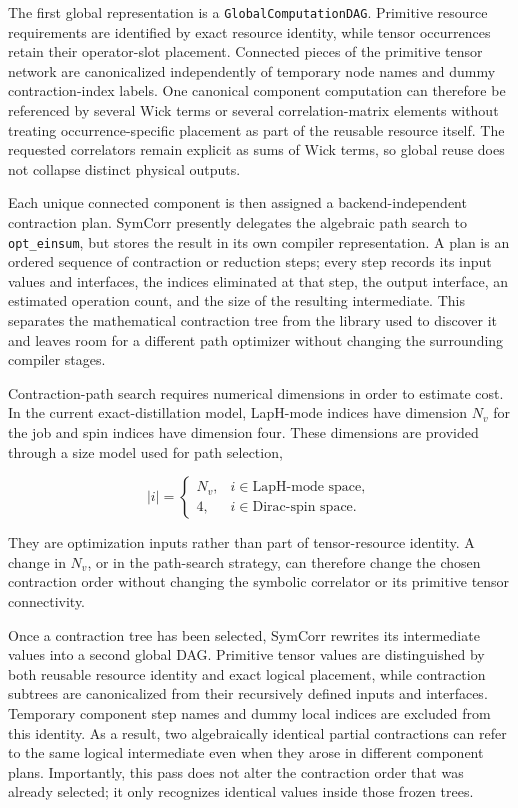 \documentclass[11pt]{article}
\begin{document}
The first global representation is a \texttt{GlobalComputationDAG}. Primitive
resource requirements are identified by exact resource identity, while tensor
occurrences retain their operator-slot placement. Connected pieces of the
primitive tensor network are canonicalized independently of temporary node names
and dummy contraction-index labels. One canonical component computation can
therefore be referenced by several Wick terms or several correlation-matrix
elements without treating occurrence-specific placement as part of the reusable
resource itself. The requested correlators remain explicit as sums of Wick
terms, so global reuse does not collapse distinct physical outputs.

Each unique connected component is then assigned a backend-independent
contraction plan. SymCorr presently delegates the algebraic path search to
\texttt{opt\_einsum}, but stores the result in its own compiler representation.
A plan is an ordered sequence of contraction or reduction steps; every step
records its input values and interfaces, the indices eliminated at that step,
the output interface, an estimated operation count, and the size of the
resulting intermediate. This separates the mathematical contraction tree from
the library used to discover it and leaves room for a different path optimizer
without changing the surrounding compiler stages.

Contraction-path search requires numerical dimensions in order to estimate
cost. In the current exact-distillation model, LapH-mode indices have dimension
\(N_v\) for the job and spin indices have dimension four. These dimensions are
provided through a size model used for path selection,

\begin{equation}
|i|=
\begin{cases}
N_v, & i\in\text{LapH-mode space},\\
4,   & i\in\text{Dirac-spin space}.
\end{cases}
\label{eq:execution_index_size_model}
\end{equation}

They are optimization inputs rather than part of tensor-resource identity. A
change in \(N_v\), or in the path-search strategy, can therefore change the
chosen contraction order without changing the symbolic correlator or its
primitive tensor connectivity.

Once a contraction tree has been selected, SymCorr rewrites its intermediate
values into a second global DAG. Primitive tensor values are distinguished by
both reusable resource identity and exact logical placement, while contraction
subtrees are canonicalized from their recursively defined inputs and interfaces.
Temporary component step names and dummy local indices are excluded from this
identity. As a result, two algebraically identical partial contractions can
refer to the same logical intermediate even when they arose in different
component plans. Importantly, this pass does not alter the contraction order
that was already selected; it only recognizes identical values inside those
frozen trees.
\end{document}
